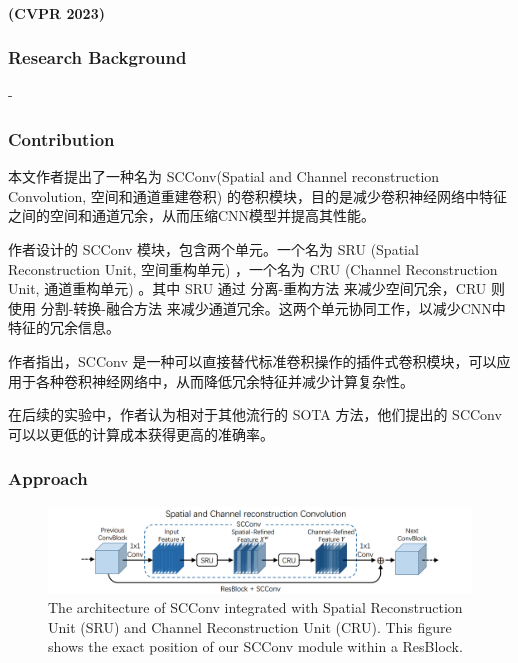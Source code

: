 \documentclass[a4paper, 10pt]{article}
\begin{document}
		\paragraph{(CVPR 2023)}
		
		\subsubsection{Research Background}
		
		-
		
		\subsubsection{Contribution}
		
		本文作者提出了一种名为 SCConv(Spatial and Channel reconstruction Convolution, 空间和通道重建卷积) 的卷积模块，目的是减少卷积神经网络中特征之间的空间和通道冗余，从而压缩CNN模型并提高其性能。
		
		作者设计的 SCConv 模块，包含两个单元。一个名为 SRU (Spatial Reconstruction Unit, 空间重构单元) ，一个名为 CRU (Channel Reconstruction Unit, 通道重构单元) 。其中 SRU 通过 分离-重构方法 来减少空间冗余，CRU 则使用 分割-转换-融合方法 来减少通道冗余。这两个单元协同工作，以减少CNN中特征的冗余信息。
		
		作者指出，SCConv 是一种可以直接替代标准卷积操作的插件式卷积模块，可以应用于各种卷积神经网络中，从而降低冗余特征并减少计算复杂性。
		
		在后续的实验中，作者认为相对于其他流行的 SOTA 方法，他们提出的 SCConv 可以以更低的计算成本获得更高的准确率。
		
		\subsubsection{Approach}
		
		\begin{figure}[htbp]
			\centering 
			\includegraphics[width=\columnwidth]{picture/LLIE/SCConv/SCConv}
			\caption{
				\label{fig: SCConv} 
				The architecture of SCConv integrated with Spatial Reconstruction Unit (SRU) and Channel Reconstruction Unit (CRU). This figure shows the exact position of our SCConv module within a ResBlock.
			}
		\end{figure}
		
\end{document}
